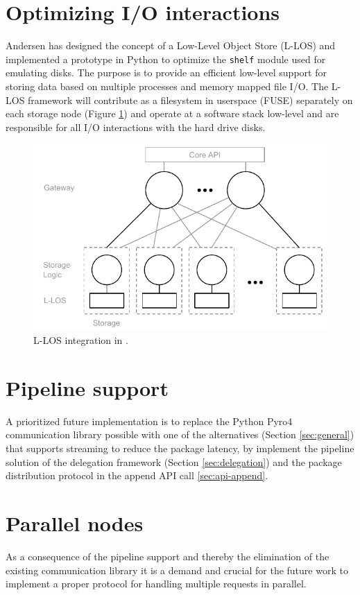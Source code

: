 \section{Optimizing I/O interactions}
Andersen has designed the concept of a Low-Level Object Store (L-LOS) and implemented a prototype in Python\cite{andersen2016} to optimize the \texttt{shelf} module used for emulating disks. The purpose is to provide an efficient low-level support for storing data based on multiple processes and memory mapped file I/O. The L-LOS framework will contribute as a filesystem in userspace (FUSE) separately on each storage node (Figure \ref{fig:sofa-llos-extension}) and operate at a software stack low-level and are responsible for all I/O interactions with the hard drive disks.

\begin{figure}
	\centering
	\includegraphics[scale=0.95]{pdf/sofa-llos-extension.pdf}
	\caption{L-LOS integration in \CodeName. \label{fig:sofa-llos-extension}}
\end{figure}

\section{Pipeline support}
A prioritized future implementation is to replace the Python Pyro4 communication library possible with one of the alternatives (Section \ref{sec:general}) that supports streaming to reduce the package latency, by implement the pipeline solution of the delegation framework (Section \ref{sec:delegation}) and the package distribution protocol in the append API call \ref{sec:api-append}.

\section{Parallel nodes}
As a consequence of the pipeline support and thereby the elimination of the existing communication library it is a demand and crucial for the future work to implement a proper protocol for handling multiple requests in parallel.

